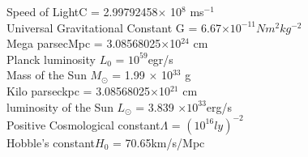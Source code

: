 Speed of Light\hspace{5.01cm}C = 2.99792458$\times$ 10$^8$ ms$^{-1}$\\
Universal Gravitational Constant\hspace{1.11cm} G = 6.67$\times 10^{-11}Nm^{2}kg^{-2}$\\
Mega parsec\hspace{5.5cm}Mpc = 3.08568025$\times$10$^{24}$ cm\\
Planck luminosity\hspace{4.15cm} $L_{0}$ = $10^{59}$egr/s\\
Mass of the Sun\hspace{4.51cm} $M_{\odot}$ = 1.99 $\times$ 10$^{33}$ g\\
Kilo parsec\hspace{5.75cm}kpc = 3.08568025$\times$10$^{21}$ cm\\
luminosity of the Sun\hspace{3.45cm} $L_{\odot}$ = 3.839 $\times 10^{33}$erg/s\\
Positive Cosmological constant\hspace{1.65cm}$\Lambda$ = $(10^{16}ly)^{-2}$\\
Hobble's constant\hspace{4.2cm}$H_{0}$ = 70.65km/s/Mpc